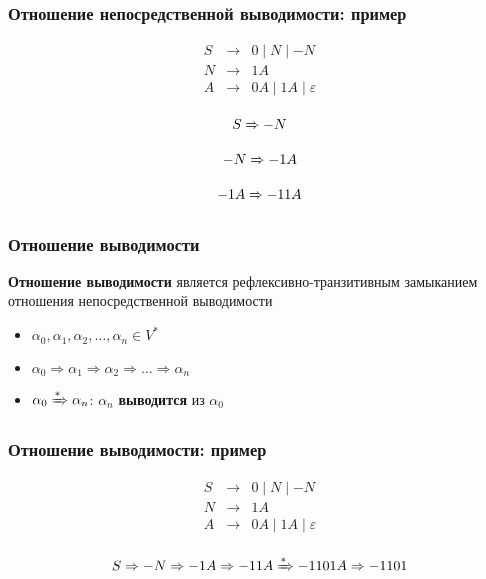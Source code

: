 \documentclass{beamer}
\newcommand{\derives}[1][*]{\xRightarrow[]{#1}}
\begin{document}
\begin{frame}[fragile]
  \transwipe[direction=90]
  \frametitle{Отношение непосредственной выводимости: пример}
  \[
  \begin{array}{rcl}
  S& \rightarrow & 0 \mid N \mid - N  \\
  N& \rightarrow & 1 A \\
  A& \rightarrow & 0 A \mid 1 A  \mid \varepsilon\\
  \end{array}
  \]

\vspace{10pt}

\[S \derives[] -N\]

\[-N \derives[] -1A\]

\[-1A \derives[] -11A\]
\end{frame}


\begin{frame}[fragile]
  \transwipe[direction=90]
  \frametitle{Отношение выводимости}

  \begin{center}
    \textbf{Отношение выводимости} является рефлексивно-транзитивным замыканием отношения непосредственной выводимости
  \end{center}

  \begin{itemize}
    \item $\alpha_0, \alpha_1, \alpha_2, \dots, \alpha_n \in V^*$
    \item $\alpha_0 \Rightarrow \alpha_1 \Rightarrow \alpha_2 \Rightarrow \dots \Rightarrow \alpha_n$
    \item $\alpha_0 \derives \alpha_n$: $\alpha_n$ \textbf{выводится} из $\alpha_0$
  \end{itemize}
\end{frame}


\begin{frame}[fragile]
  \transwipe[direction=90]
  \frametitle{Отношение выводимости: пример}

  \[
  \begin{array}{rcl}
  S& \rightarrow & 0 \mid N \mid - N  \\
  N& \rightarrow & 1 A \\
  A& \rightarrow & 0 A \mid 1 A  \mid \varepsilon\\
  \end{array}
  \]

  \[ S \Rightarrow - N \Rightarrow - 1 A \Rightarrow - 1 1 A \derives - 1 1 0 1 A \Rightarrow - 1 1 0 1 \]
\end{frame}
\end{document}
